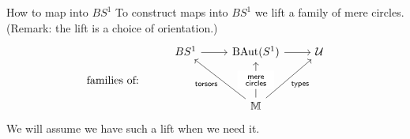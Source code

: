 \begin{frame}{How to map into \( BS^1 \)}
To construct maps into \( BS^1 \) we \alert{lift} a family of mere circles. (Remark: the lift is a choice of \alert{orientation}.)
\[\begin{tikzcd}[ampersand replacement=\&, row sep=small]
  \& {BS^1} \& {\BAut (S^1)} \& \uni \\
  {\text{families of:}} \\
  \&\& \mm
  \arrow[from=1-2, to=1-3]
  \arrow[from=1-3, to=1-4]
  \arrow["{\mathrm{torsors}}", from=3-3, to=1-2]
  \arrow["\begin{array}{c} \substack{\mathrm{mere}\\ \mathrm{circles}} \end{array}"{description}, from=3-3, to=1-3]
  \arrow["{\mathrm{types}}"', from=3-3, to=1-4]
\end{tikzcd}\]
We will assume we have such a lift when we need it.

\end{frame}


% 

